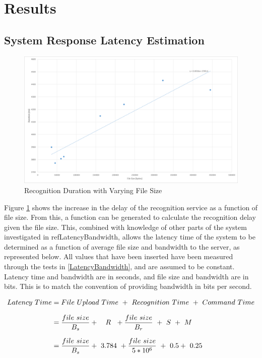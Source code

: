 \documentclass{article}
\begin{document}
\section{Results}


\subsection{System Response Latency Estimation}


\begin{figure}[h]
\caption{Recognition Duration with Varying File Size\label{fig:RecognitionDuration}}
\includegraphics[width=\textwidth]{RecognitionDuration}
\end{figure}

Figure \ref{fig:RecognitionDuration} shows the increase in the delay of the recognition service as a function of file size. From this, a function can be generated to calculate the recognition delay given the file size. This, combined with knowledge of other parts of the system investigated in ref{LatencyBandwidth}, allows the latency time of the system to be determined as a function of average file size and bandwidth to the server, as represented below. All values that have been inserted have been measured through the tests in \ref{LatencyBandwidth}, and are assumed to be constant. Latency time and bandwidth are in seconds, and file size and bandwidth are in bits. This is to match the convention of providing bandwidth in bits per second. 

\begin{equation*}
\setlength{\jot}{10pt}
\begin{split}
Latency\ Time 	&= File\ Upload\ Time\ +\ Recognition\ Time\ +\ Command\ Time \\
				&= \frac{file\ size}{B_s} +\ \ \ R\ \ + \frac{file\ size}{B_r}\ +\ S\  +\ M \\
				&= \frac{file\ size}{B_s} +\ 3.784\ + \frac{file\ size}{5*10^6}\ +\ 0.5 +\ 0.25 
\end{split}
\end{equation*}
\end{document}
